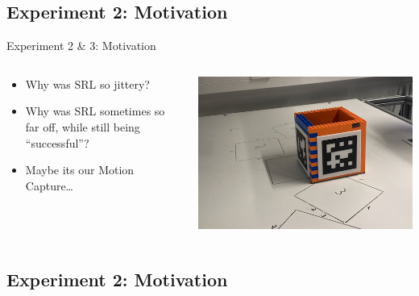 \documentclass[16:9,en,navbarinfooter]{sdqbeamer}
\begin{document}
\subsection{Experiment 2: Motivation}
\begin{frame}{Experiment 2 \& 3: Motivation}

	\vspace{1cm}
	\begin{columns}
		\begin{column}{0.5\textwidth}
			\begin{itemize}
				\item Why was SRL so jittery?
				\item Why was SRL sometimes so far off, while still being ``successful''?
				\item Maybe its our Motion Capture\dots
			\end{itemize}
		\end{column}
		\begin{column}{0.5\textwidth}
			\includegraphics[width=\textwidth]{media/trpl_8cm.png}\\
		\end{column}
	\end{columns}
\end{frame}
\subsection{Experiment 2: Motivation}
\end{document}
